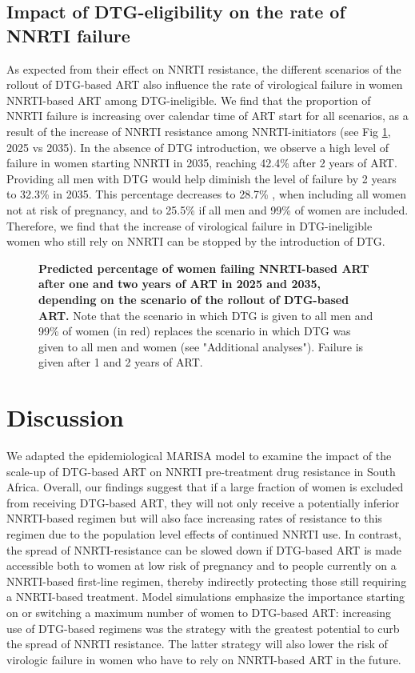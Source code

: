 \documentclass[10pt,letterpaper]{article}
\newcommand{\numberk}{42.4\% }
\newcommand{\numberl}{32.3\% }
\newcommand{\numberm}{28.7\% }
\newcommand{\numbern}{25.5\% }
\begin{document}
\subsection*{Impact of DTG-eligibility on the rate of NNRTI failure}
As expected from their effect on NNRTI resistance, the different scenarios of the rollout of DTG-based ART also influence the rate of virological failure in women NNRTI-based ART among DTG-ineligible. We find that the proportion of NNRTI failure is increasing over calendar time of ART start for all scenarios, as a result of the increase of NNRTI resistance among NNRTI-initiators (see Fig \ref{fig5}, 2025 vs 2035). In the absence of DTG introduction, we observe a high level of failure in women starting NNRTI in 2035, reaching \numberk after 2 years of ART. Providing all men with DTG would help diminish the level of failure by 2 years to \numberl in 2035. This percentage decreases to \numberm , when including all women not at risk of pregnancy, and to \numbern if all men and 99\% of women are included. Therefore, we find that the increase of virological failure in DTG-ineligible women who still rely on NNRTI can be stopped by the introduction of DTG.

\begin{figure}[h]
\vspace{0.5cm}
\caption{{\bf Predicted percentage of women failing NNRTI-based ART after one and two years of ART in 2025 and 2035, depending on the scenario of the rollout of DTG-based ART.} Note that the scenario in which DTG is given to all men and 99\% of women (in red) replaces the scenario in which DTG was given to all men and women (see "Additional analyses"). Failure is given after 1 and 2 years of ART.}\label{fig5}
\end{figure}

\section*{Discussion}
We adapted the epidemiological MARISA model to examine the impact of the scale-up of DTG-based ART on NNRTI pre-treatment drug resistance in South Africa. Overall, our findings suggest that if a large fraction of women is excluded from receiving DTG-based ART, they will not only receive a potentially inferior NNRTI-based regimen but will also face increasing rates of resistance to this regimen due to the population level effects of continued NNRTI use. In contrast, the spread of NNRTI-resistance can be slowed down if DTG-based ART is made accessible both to women at low risk of pregnancy and to people currently on a NNRTI-based first-line regimen, thereby indirectly protecting those still requiring a NNRTI-based treatment. Model simulations emphasize the importance starting on or switching a maximum number of women to DTG-based ART: increasing use of DTG-based regimens was the strategy with the greatest potential to curb the spread of NNRTI resistance. The latter strategy will also lower the risk of virologic failure in women who have to rely on NNRTI-based ART in the future.
\end{document}

